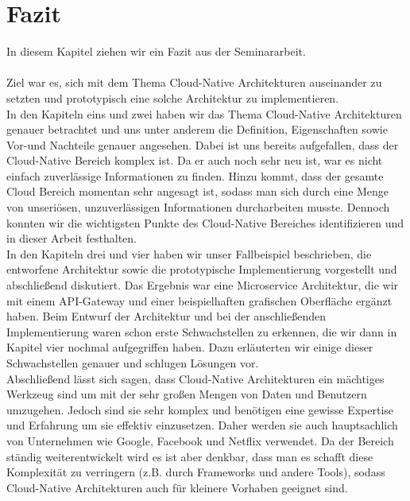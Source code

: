 \chapter{Fazit}

In diesem Kapitel ziehen wir ein Fazit aus der Seminararbeit.\\
\\
Ziel war es, sich mit dem Thema Cloud-Native Architekturen auseinander zu setzten und prototypisch eine solche Architektur zu implementieren.\\
In den Kapiteln eins und zwei haben wir das Thema Cloud-Native Architekturen genauer betrachtet und uns unter anderem die Definition, Eigenschaften sowie Vor-und Nachteile genauer angesehen. Dabei ist uns bereits aufgefallen, dass der Cloud-Native Bereich komplex ist. Da er auch noch sehr neu ist, war es nicht einfach zuverlässige Informationen zu finden. Hinzu kommt, dass der gesamte Cloud Bereich momentan sehr angesagt ist, sodass man sich durch eine Menge von unseriösen, unzuverlässigen Informationen durcharbeiten musste. Dennoch konnten wir die wichtigsten Punkte des Cloud-Native Bereiches identifizieren und in dieser Arbeit festhalten.\\
In den Kapiteln drei und vier haben wir unser Fallbeispiel beschrieben, die entworfene Architektur sowie die prototypische Implementierung vorgestellt und abschließend diskutiert. Das Ergebnis war eine Microservice Architektur, die wir mit einem API-Gateway und einer beispielhaften grafischen Oberfläche ergänzt haben. Beim Entwurf der Architektur und bei der anschließenden Implementierung waren schon erste Schwachstellen zu erkennen, die wir dann in Kapitel vier nochmal aufgegriffen haben. Dazu erläuterten wir einige dieser Schwachstellen genauer und schlugen Lösungen vor.\\
Abschließend lässt sich sagen, dass Cloud-Native Architekturen ein mächtiges Werkzeug sind um mit der sehr großen Mengen von Daten und Benutzern umzugehen. Jedoch sind sie sehr komplex und benötigen eine gewisse Expertise und Erfahrung um sie effektiv einzusetzen. Daher werden sie auch hauptsachlich von Unternehmen wie Google, Facebook und Netflix verwendet. Da der Bereich ständig weiterentwickelt wird es ist aber denkbar, dass man es schafft diese Komplexität zu verringern (z.B. durch Frameworks und andere Tools), sodass Cloud-Native Architekturen auch für kleinere Vorhaben geeignet sind.